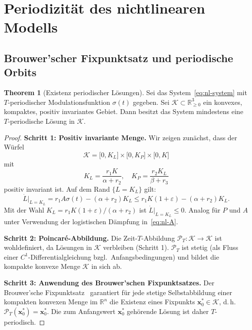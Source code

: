 ﻿\documentclass[12pt, a4paper]{article}
\theoremstyle{definition}
\newtheorem{theorem}{Theorem}[section]
\newcommand{\R}{\mathbb{R}}
\begin{document}
\section{Periodizität des nichtlinearen Modells}

\subsection{Brouwer'scher Fixpunktsatz und periodische Orbits}

\begin{theorem}[Existenz periodischer Lösungen]\label{thm:periodisch-nl}
Sei das System~\eqref{eq:nl-system} mit $T$-periodischer Modulationsfunktion
$\sigma(t)$ gegeben. Sei $\mathcal{K} \subset \R_{\geq 0}^3$ ein konvexes, kompaktes,
positiv invariantes Gebiet. Dann besitzt das System mindestens eine
$T$-periodische Lösung in $\mathcal{K}$.
\end{theorem}

\begin{proof}
\textbf{Schritt 1: Positiv invariante Menge.}
Wir zeigen zunächst, dass der Würfel
\[
  \mathcal{K} = \bigl[0, K_L\bigr] \times \bigl[0, K_P\bigr] \times \bigl[0, K\bigr]
\]
mit
\[
  K_L = \frac{r_1 K}{\alpha + r_2},\quad K_P = \frac{r_2 K_L}{\beta + r_3}
\]
positiv invariant ist. Auf dem Rand $\{L = K_L\}$ gilt:
\[
  \dot{L}\big|_{L=K_L} = r_1 A \sigma(t) - (\alpha + r_2) K_L
  \leq r_1 K (1 + \varepsilon) - (\alpha + r_2) K_L.
\]
Mit der Wahl $K_L = r_1 K (1+\varepsilon)/(\alpha + r_2)$ ist $\dot{L}|_{L=K_L} \leq 0$.
Analog für $P$ und $A$ unter Verwendung der logistischen Dämpfung in~\eqref{eq:nl-A}.

\textbf{Schritt 2: Poincaré-Abbildung.}
Die Zeit-$T$-Abbildung $\mathcal{P}_T: \mathcal{K} \to \mathcal{K}$ ist
wohldefiniert, da Lösungen in $\mathcal{K}$ verbleiben (Schritt 1).
$\mathcal{P}_T$ ist stetig (als Fluss einer $C^1$-Differentialgleichung bzgl.\
Anfangsbedingungen) und bildet die kompakte konvexe Menge $\mathcal{K}$ in sich ab.

\textbf{Schritt 3: Anwendung des Brouwer'schen Fixpunktsatzes.}
Der Brouwer'sche Fixpunktsatz~\cite{Brouwer1911} garantiert für jede stetige
Selbstabbildung einer kompakten konvexen Menge im $\R^n$ die Existenz eines
Fixpunkts $\bm{x}^*_0 \in \mathcal{K}$, d.\,h.\
$\mathcal{P}_T(\bm{x}^*_0) = \bm{x}^*_0$. Die zum Anfangswert $\bm{x}^*_0$
gehörende Lösung ist daher $T$-periodisch. \hfill
\end{proof}
\end{document}
